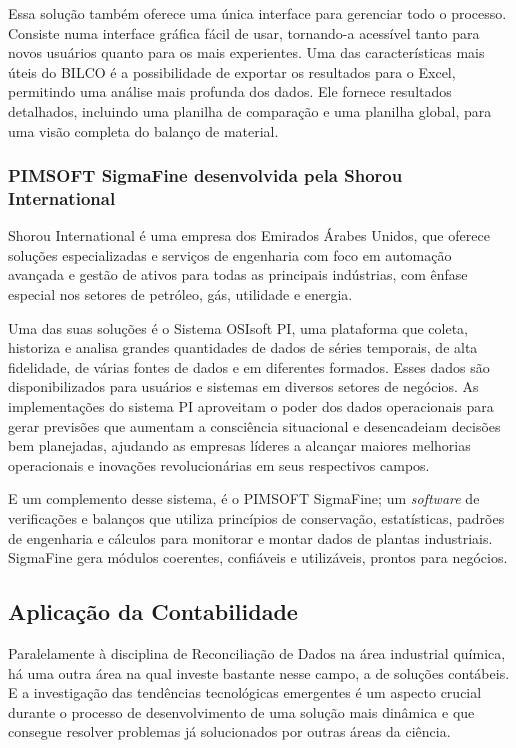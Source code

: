 Essa solução também oferece uma única interface para gerenciar todo o processo. Consiste numa interface gráfica fácil de usar, tornando-a acessível tanto para novos usuários quanto para os mais experientes. Uma das características mais úteis do BILCO é a possibilidade de exportar os resultados para o Excel, permitindo uma análise mais profunda dos dados. Ele fornece resultados detalhados, incluindo uma planilha de comparação e uma planilha global, para uma visão completa do balanço de material.

\subsubsection{PIMSOFT SigmaFine desenvolvida pela Shorou International}

Shorou International é uma empresa dos Emirados Árabes Unidos, que oferece soluções especializadas e serviços de engenharia com foco em automação avançada e gestão de ativos para todas as principais indústrias, com ênfase especial nos setores de petróleo, gás, utilidade e energia.

Uma das suas soluções é o Sistema OSIsoft PI, uma plataforma que coleta, historiza e analisa grandes quantidades de dados de séries temporais, de alta fidelidade, de várias fontes de dados e em diferentes formados. Esses dados são disponibilizados para usuários e sistemas em diversos setores de negócios. As implementações do sistema PI aproveitam o poder dos dados operacionais para gerar previsões que aumentam a consciência situacional e desencadeiam decisões bem planejadas, ajudando as empresas líderes a alcançar maiores melhorias operacionais e inovações revolucionárias em seus respectivos campos. 

E um complemento desse sistema, é o PIMSOFT SigmaFine; um \textit{software} de verificações e balanços que utiliza princípios de conservação, estatísticas, padrões de engenharia e cálculos para monitorar e montar dados de plantas industriais. SigmaFine gera módulos coerentes, confiáveis e utilizáveis, prontos para negócios.

\subsection{Aplicação da Contabilidade}

Paralelamente à disciplina de Reconciliação de Dados na área industrial química, há uma outra área na qual investe bastante nesse campo, a de soluções contábeis. E a investigação das tendências tecnológicas emergentes é um aspecto crucial durante o processo de desenvolvimento de uma solução mais dinâmica e que consegue resolver problemas já solucionados por outras áreas da ciência.

